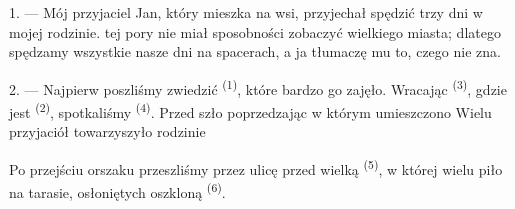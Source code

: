 %
%
%

\VUsaut{4.0mm}
\VUsaut{3.0mm}

\VUsaut{3.0mm}

1. --- Mój przyjaciel Jan, który mieszka na wsi, przyjechał spędzić trzy dni w mojej
rodzinie.  tej pory nie miał sposobności zobaczyć wielkiego miasta; dlatego
spędzamy wszystkie nasze dni na spacerach, a ja tłumaczę mu to, czego nie zna.

2. --- Najpierw poszliśmy zwiedzić  \textsuperscript{(1)}, które
bardzo go zajęło. Wracając  \textsuperscript{(3)}, gdzie jest
 \textsuperscript{(2)}, spotkaliśmy 
\textsuperscript{(4)}. Przed  szło 
poprzedzając  w którym umieszczono  Wielu przyjaciół
towarzyszyło rodzinie 

Po przejściu orszaku przeszliśmy przez ulicę przed wielką 
\textsuperscript{(5)}, w której wielu  piło  na
tarasie, osłoniętych oszkloną  \textsuperscript{(6)}.

